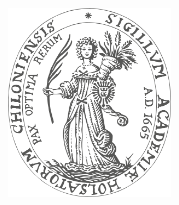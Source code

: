 % 
% 
% 



\thispagestyle{empty}

\setcounter{page}{1}




\begin{center}
    \textbf{{\LARGE {}\thesisSchool}}\\
\end{center}



\vspace*{25mm}

\begin{center}
    \includegraphics[height=50mm,width=50mm]{opening/resources/logos/logo_cau_2.png}

    \vspace*{5mm}
    \textbf{\large \textsc{{\thesisDegree} }}
\end{center}

\vspace*{0mm}

\begin{center}
    \textbf{\large \thesisType}
\end{center}

\vspace*{10mm}

